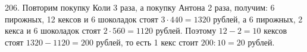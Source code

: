 206. Повторим покупку Коли 3 раза, а покупку Антона 2 раза, получим: 6 пирожных, 12 кексов и 6 шоколадок стоят $3\cdot440=1320$ рублей, а 6 пирожных, 2 кекса и 6 шоколадок стоят $2\cdot560=1120$ рублей. Поэтому $12-2=10$ кексов стоят $1320-1120=200$ рублей, то есть 1 кекс стоит $200:10=20$ рублей.\\
